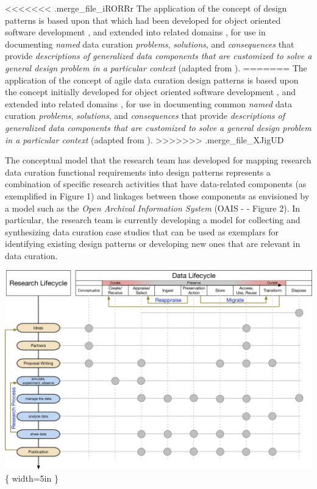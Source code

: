 \documentclass[paper]{ijdc-v9}
\begin{document}
\textless{}\textless{}\textless{}\textless{}\textless{}\textless{}\textless{}
.merge\_file\_iRORRr The application of the concept of design patterns
is based upon that which had been developed for object oriented software
development \autocite{gamma_design_1995}, and extended into related
domains
\autocites{daigneau_service_2011}{lasater_design_2010}{ackerman_patterns-based_2010}{schwinn_design_2005}{hohpe_enterprise_2003},
for use in documenting \emph{named} data curation \emph{problems},
\emph{solutions}, and \emph{consequences} that provide
\emph{descriptions of generalized data components that are customized to
solve a general design problem in a particular context} (adapted from
\autocite[section 1.1]{gamma_design_1995}). ======= The application of
the concept of agile data curation design patterns is based upon the
concept initially developed for object oriented software development
\autocite{gamma_design_1995}, and extended into related domains
\autocites{daigneau_service_2011}{lasater_design_2010}{ackerman_patterns-based_2010}{schwinn_design_2005}{hohpe_enterprise_2003},
for use in documenting common \emph{named} data curation
\emph{problems}, \emph{solutions}, and \emph{consequences} that provide
\emph{descriptions of generalized data components that are customized to
solve a general design problem in a particular context} (adapted from
\autocite[section 1.1]{gamma_design_1995}).
\textgreater{}\textgreater{}\textgreater{}\textgreater{}\textgreater{}\textgreater{}\textgreater{}
.merge\_file\_XJigUD

The conceptual model that the research team has developed for mapping
research data curation functional requirements into design patterns
represents a combination of specific research activities that have
data-related components (as exemplified in Figure 1) and linkages
between those components as envisioned by a model such as the \emph{Open
Archival Information System} (OAIS -
\autocites{book_reference_2012}{_iso_2012}{oclc_open_2014} - Figure 2).
In particular, the research team is currently developing a model for
collecting and synthesizing data curation case studies that can be used
as exemplars for identifying existing design patterns or developing new
ones that are relevant in data curation.

\includegraphics{Research-DataLifecycleIntegration.png}\{ width=5in \}
\end{document}
